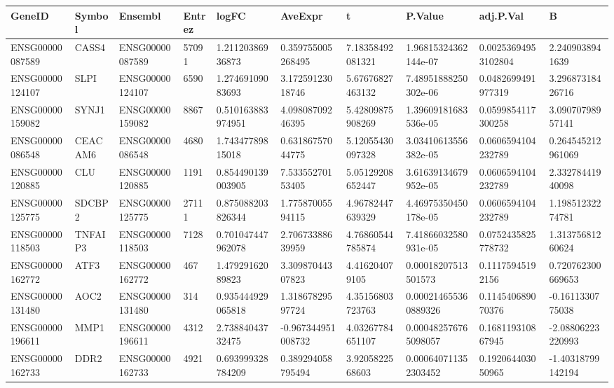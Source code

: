 \begingroup
\tiny
\setlength{\tabcolsep}{2pt}
\renewcommand{\arraystretch}{1.18}
\begin{tabular}{@{}llllllllll@{}}
\toprule
GeneID & Symbol & Ensembl & Entrez & logFC & AveExpr & t & P.Value & adj.P.Val & B \\
\midrule
ENSG00000087589 & CASS4 & ENSG00000087589 & 57091 & 1.21120386936873 & 0.359755005268495 & 7.18358492081321 & 1.96815324362144e-07 & 0.00253694953102804 & 2.2409038941639 \\
ENSG00000124107 & SLPI & ENSG00000124107 & 6590 & 1.27469109083693 & 3.17259123018746 & 5.67676827463132 & 7.48951888250302e-06 & 0.0482699491977319 & 3.29687318426716 \\
ENSG00000159082 & SYNJ1 & ENSG00000159082 & 8867 & 0.510163883974951 & 4.09808709246395 & 5.42809875908269 & 1.39609181683536e-05 & 0.0599854117300258 & 3.09070798957141 \\
ENSG00000086548 & CEACAM6 & ENSG00000086548 & 4680 & 1.74347789815018 & 0.63186757044775 & 5.12055430097328 & 3.03410613556382e-05 & 0.0606594104232789 & 0.264545212961069 \\
ENSG00000120885 & CLU & ENSG00000120885 & 1191 & 0.854490139003905 & 7.53355270153405 & 5.05129208652447 & 3.61639134679952e-05 & 0.0606594104232789 & 2.33278441940098 \\
ENSG00000125775 & SDCBP2 & ENSG00000125775 & 27111 & 0.875088203826344 & 1.77587005594115 & 4.96782447639329 & 4.46975350450178e-05 & 0.0606594104232789 & 1.19851232274781 \\
ENSG00000118503 & TNFAIP3 & ENSG00000118503 & 7128 & 0.701047447962078 & 2.70673388639959 & 4.76860544785874 & 7.41866032580931e-05 & 0.0752435825778732 & 1.31375681260624 \\
ENSG00000162772 & ATF3 & ENSG00000162772 & 467 & 1.47929162089823 & 3.30987044307823 & 4.416204079105 & 0.00018207513501573 & 0.11175945192156 & 0.720762300669653 \\
ENSG00000131480 & AOC2 & ENSG00000131480 & 314 & 0.935444929065818 & 1.31867829597724 & 4.35156803723763 & 0.000214655360889326 & 0.114540689070376 & -0.1611330775038 \\
ENSG00000196611 & MMP1 & ENSG00000196611 & 4312 & 2.73884043732475 & -0.967344951008732 & 4.03267784651107 & 0.000482576765098057 & 0.168119310867945 & -2.08806223220993 \\
ENSG00000162733 & DDR2 & ENSG00000162733 & 4921 & 0.693999328784209 & 0.389294058795494 & 3.9205822568603 & 0.000640711352303452 & 0.192064403050965 & -1.40318799142194 \\

\end{tabular}
